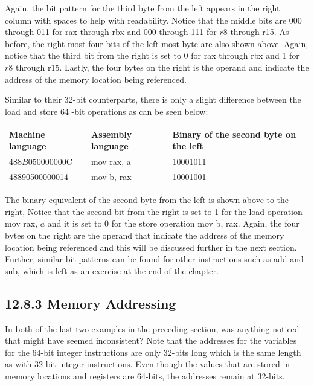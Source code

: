\documentclass[10pt]{book}
\begin{document}
\begin{center}
\begin{center}
\begin{center}
\begin{center}
\begin{center}
Again, the bit pattern for the third byte from the left appears in the right column with spaces to help with readability. Notice that the middle bits are 000 through 011 for rax through rbx and 000 through 111 for $r 8$ through r15. As before, the right most four bits of the left-most byte are also shown above. Again, notice that the third bit from the right is set to 0 for rax through rbx and 1 for $r 8$ through r15. Lastly, the four bytes on the right is the operand and indicate the address of the memory location being referenced.

Similar to their 32-bit counterparts, there is only a slight difference between the load and store 64 -bit operations as can be seen below:

\begin{center}
\begin{tabular}{|l|l|l|}
\hline
Machine language & Assembly language & Binary of the second byte on the left \\
\hline
$488 B 050000000 \mathrm{C}$ & mov rax, a & 10001011 \\
\hline
48890500000014 & mov b, rax & 10001001 \\
\hline
\end{tabular}
\end{center}

The binary equivalent of the second byte from the left is shown above to the right, Notice that the second bit from the right is set to 1 for the load operation mov rax, $a$ and it is set to 0 for the store operation mov b, rax. Again, the four bytes on the right are the operand that indicate the address of the memory location being referenced and this will be discussed further in the next section. Further, similar bit patterns can be found for other instructions such as add and sub, which is left as an exercise at the end of the chapter.

\subsection*{12.8.3 Memory Addressing}
In both of the last two examples in the preceding section, was anything noticed that might have seemed inconsistent? Note that the addresses for the variables for the 64-bit integer instructions are only 32-bits long which is the same length as with 32-bit integer instructions. Even though the values that are stored in memory locations and registers are 64-bits, the addresses remain at 32-bits.



\end{center}
\end{center}
\end{center}
\end{center}
\end{center}
\end{document}
